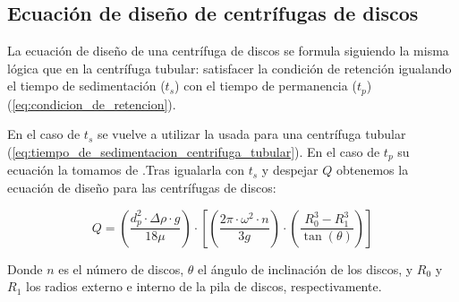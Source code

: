 \documentclass{AsignaturaResumen}
\begin{document}
\subsection{Ecuación de diseño de centrífugas de discos}

La ecuación de diseño de una centrífuga de discos se formula siguiendo la misma lógica que en la centrífuga tubular: satisfacer la condición de retención igualando el tiempo de sedimentación ($t_{s}$) con el tiempo de permanencia ($t_{p}$) (\autoref{eq:condicion_de_retencion}).

En el caso de $t_{s}$ se vuelve a utilizar la usada para una centrífuga tubular (\autoref{eq:tiempo_de_sedimentacion_centrifuga_tubular}). En el caso de  $t_{p}$ su ecuación la tomamos de \citeauthor{tejedamansirBioseparaciones2011}.\footnotemark Tras igualarla con $t_{s}$ y despejar $Q$ obtenemos la ecuación de diseño para las centrífugas de discos:

\begin{equation}\label{eq:diseño_de_centrifugas_de_discos}
    Q=\left(\frac{d_{p}^{2}\cdot\Delta\rho\cdot g}{18\mu}\right)\cdot\left[\left(\frac{2\pi\cdot\omega^{2}\cdot n}{3g}\right)\cdot\left(\frac{R_{0}^{3}-R_{1}^{3}}{\tan(\theta)}\right)\right]
\end{equation}

Donde $n$ es el número de discos, $\theta$ el ángulo de inclinación de los discos, y $R_{0}$ y $R_{1}$ los radios externo e interno de la pila de discos, respectivamente.
\end{document}
